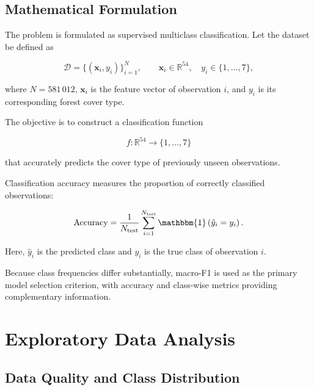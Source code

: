 \documentclass[10pt,a4paper]{article}
\begin{document}
\subsection{Mathematical Formulation}

The problem is formulated as supervised multiclass classification.
Let the dataset be defined as

\begin{equation}
\mathcal{D} = \{(\mathbf{x}_i,y_i)\}_{i=1}^{N},
\qquad
\mathbf{x}_i \in \mathbb{R}^{54},
\quad
y_i \in \{1,\ldots,7\},
\end{equation}

where $N=581\,012$, $\mathbf{x}_i$ is the feature vector of
observation $i$, and $y_i$ is its corresponding forest cover type.

The objective is to construct a classification function

\begin{equation}
f:\mathbb{R}^{54}\longrightarrow\{1,\ldots,7\}
\end{equation}

that accurately predicts the cover type of previously unseen
observations.

Classification accuracy measures the proportion of correctly
classified observations:

\begin{equation}
\mathrm{Accuracy} =
\frac{1}{N_{\mathrm{test}}}
\sum_{i=1}^{N_{\mathrm{test}}}
\mathbbm{1}\left(\hat{y}_i = y_i\right).
\end{equation}

Here, $\hat{y}_i$ is the predicted class and $y_i$ is the true
class of observation $i$.

Because class frequencies differ substantially, macro-F1 is
used as the primary model selection criterion, with accuracy
and class-wise metrics providing complementary information.
\clearpage



\section{Exploratory Data Analysis}

\subsection{Data Quality and Class Distribution}
\end{document}
